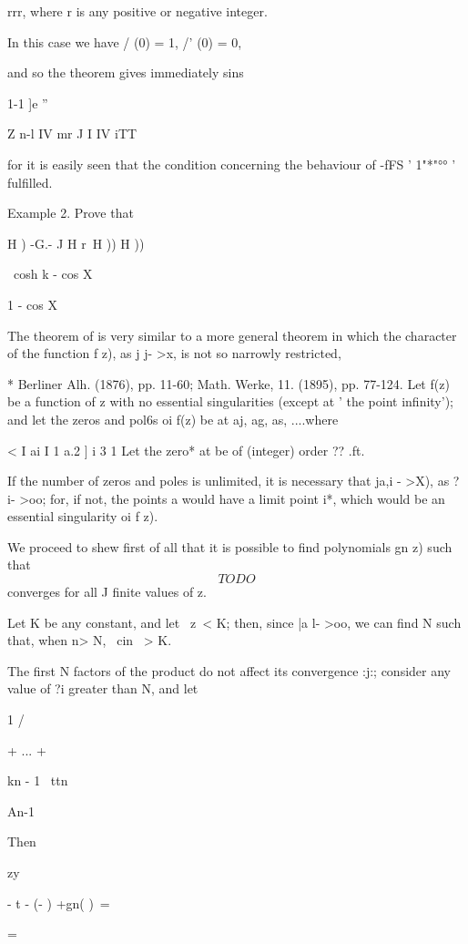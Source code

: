 rrr, where r is any positive or negative integer.

In this case we have / (0) = 1, /' (0) = 0,

and so the theorem gives immediately sins

1-1 ]e ''

Z n-l IV mr J I IV iTT

for it is easily seen that the condition concerning the behaviour of
-fFS ' 1"*"°° ' fulfilled.

Example 2. Prove that

H ) -G.- J H r\ H )) H ))

\ cosh k - cos X

1 - cos X



The theorem of is very similar to a more general theorem in
which the character of the function f z), as j j- >x, is not so
narrowly restricted,

* Berliner Alh. (1876), pp. 11-60; Math. Werke, 11. (1895), pp.
77-124.
%
%
Let f(z) be a function of z with no essential singularities (except at
' the point infinity'); and let the zeros and pol6s oi f(z) be at aj,
ag, as, ....where

< I ai I 1 a.2 ] i 3 1 Let the zero* at be of (integer) order ?? .ft.

If the number of zeros and poles is unlimited, it is necessary that
ja,i - >X), as ?i- >oo; for, if not, the points a would have a limit
point i*, which would be an essential singularity oi f z).

We proceed to shew first of all that it is possible to find
polynomials gn z) such that
$$
TODO
$$
converges for all J finite values of z.

Let K be any constant, and let \ z\ < K; then, since |a l- >oo, we can
find N such that, when n> N, \ cin \ > K.

The first N factors of the product do not affect its convergence :j:;
consider any value of ?i greater than N, and let

1 /

+ ... +

kn - 1 \ ttn

An-1

Then

zy

- t - (- ) +gn( )\ =

=

